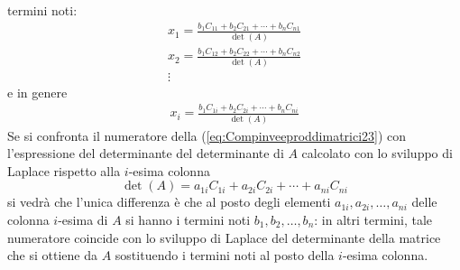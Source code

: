 termini noti:
\begin{eqnarray*}
  x_1=\frac{b_1C_{11}+b_2C_{21}+\cdots+b_nC_{n1}}{\det(A)}\\
  x_2=\frac{b_1C_{12}+b_2C_{22}+\cdots+b_nC_{n2}}{\det(A)}\\
  \vdots
\end{eqnarray*}
e in genere
\begin{eqnarray}
  \label{eq:Compinveeproddimatrici23}
  x_i=\frac{b_1C_{1i}+b_2C_{2i}+\cdots+b_nC_{ni}}{\det(A)}
\end{eqnarray}
Se si confronta il numeratore della (\ref{eq:Compinveeproddimatrici23}) con l'espressione del
determinante del determinante di $A$ calcolato con lo sviluppo di Laplace rispetto alla $i$-esima colonna
\begin{equation*}
  \det(A)=a_{1i}C_{1i}+a_{2i}C_{2i}+\cdots+a_{ni}C_{ni}
\end{equation*}
si vedrà che l'unica differenza è che al posto degli elementi $a_{1i},a_{2i},\dots,a_{ni}$ delle colonna
$i$-esima di $A$ si hanno i termini noti $b_1,b_2,\dots,b_n$: in altri termini, tale numeratore coincide
con lo sviluppo di Laplace del determinante della matrice che si ottiene da $A$ sostituendo i termini
noti al posto della $i$-esima colonna.

